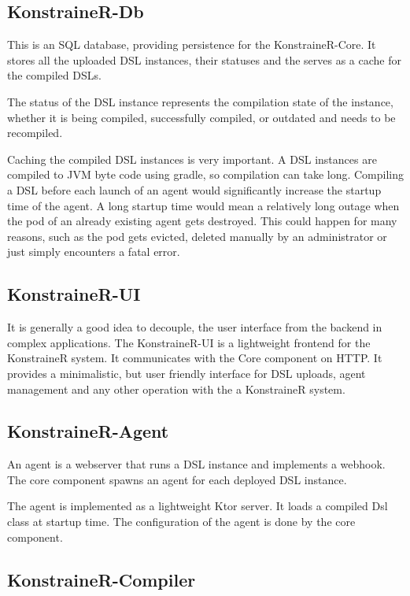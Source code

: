 \subsection{KonstraineR-Db}

This is an SQL database, providing persistence for the KonstraineR-Core. It stores all the uploaded DSL instances, their statuses and the serves as a cache for the compiled DSLs.

The status of the DSL instance represents the compilation state of the instance, whether it is being compiled, successfully compiled, or outdated and needs to be recompiled.

Caching the compiled DSL instances is very important. A DSL instances are compiled to JVM byte code using gradle, so compilation can take long. Compiling a DSL before each launch of an agent would significantly increase the startup time of the agent. A long startup time would mean a relatively long outage when the pod of an already existing agent gets destroyed. This could happen for many reasons, such as the pod gets evicted, deleted manually by an administrator or just simply encounters a fatal error.

\subsection{KonstraineR-UI}

It is generally a good idea to decouple, the user interface from the backend in complex applications. The KonstraineR-UI  is a lightweight frontend for the KonstraineR system. It communicates with the Core component on HTTP. It provides a minimalistic, but user friendly interface for DSL uploads, agent management and any other operation with the a KonstraineR system.

\subsection{KonstraineR-Agent}

An agent is a webserver that runs a DSL instance and implements a webhook. The core component spawns an agent for each deployed DSL instance.

The agent is implemented as a lightweight Ktor server. It loads a compiled Dsl class at startup time. The configuration of the agent is done by the core component.

\subsection{KonstraineR-Compiler}

